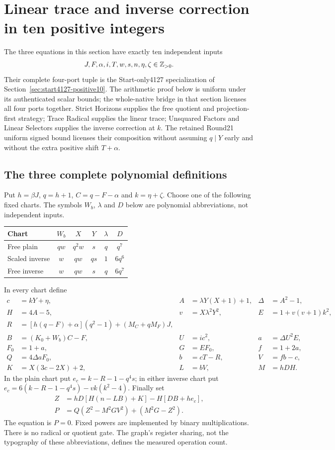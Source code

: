 \section{Linear trace and inverse correction in ten positive integers}
\label{sec:positive}
The three equations in this section have exactly ten independent inputs
\[
 J,F,\alpha,i,T,w,s,n,\eta,\zeta\in\mathbb Z_{>0}.
\]
Their complete four-port tuple is the Start-only4127 specialization
of Section~\ref{sec:start4127-positive10}. The arithmetic proof below is
uniform under its authenticated scalar bounds; the whole-native bridge
in that section licenses all four ports together. Strict Horizons
supplies the free quotient and projection-first strategy; Trace Radical
supplies the linear trace; Unsquared Factors and Linear Selectors
supplies the inverse correction at $k$. The retained Round21 uniform signed bound
licenses their composition without assuming $q\mid Y$ early and
without the extra positive shift $T+\alpha$.

\subsection{The three complete polynomial definitions}
Put $h=\beta J$, $q=h+1$, $C=q-F-\alpha$ and $k=\eta+\zeta$.
Choose one of the following fixed charts. The symbols $W_b$, $\lambda$
and $D$ below are polynomial abbreviations, not independent inputs.
\begin{center}\small
\begin{tabular}{@{}lccccc@{}}\toprule
Chart & $W_b$ & $X$ & $Y$ & $\lambda$ & $D$\\\midrule
Free plain & $qw$ & $q^2w$ & $s$ & $q$ & $q^7$\\
Scaled inverse & $w$ & $qw$ & $qs$ & $1$ & $6q^6$\\
Free inverse & $w$ & $qw$ & $s$ & $q$ & $6q^7$\\\bottomrule
\end{tabular}
\end{center}
In every chart define
\begin{align*}
 c&=kY+\eta,& A&=\lambda Y(X+1)+1,&\Delta&=A^2-1,\\
 H&=4A-5,&v&=X\lambda^2Y^2,&E&=1+v(v+1)k^2,\\
 R&=[h(q-F)+\alpha](q^2-1)+(M_C+qM_F)J,\\
 B&=(K_0+W_b)C-F,&U&=ic^2,&a&=\Delta U^2E,\\
 F_0&=1+a,&G&=EF_0,&f&=1+2a,\\
 Q&=4\Delta aF_0,&b&=cT-R,&V&=fb-c,\\
 K&=X(3c-2X)+2,&L&=bV,&M&=hDH.
\end{align*}
In the plain chart put $e_c=k-R-1-q^4s$; in either inverse chart put
$e_c=6(k-R-1-q^4s)-vk(k^2-4)$. Finally set
\begin{align}
 Z&=hD[H(n-LB)+K]-H[DB+he_c],\nonumber\\
 P&=Q(Z^2-M^2GV^2)+(M^2G-Z^2).\label{eq:positive-polynomial}
\end{align}
The equation is $P=0$. Fixed powers are implemented by binary
multiplications. There is no radical or quotient gate. The graph's
register sharing, not the typography of these abbreviations, defines
the measured operation count.

